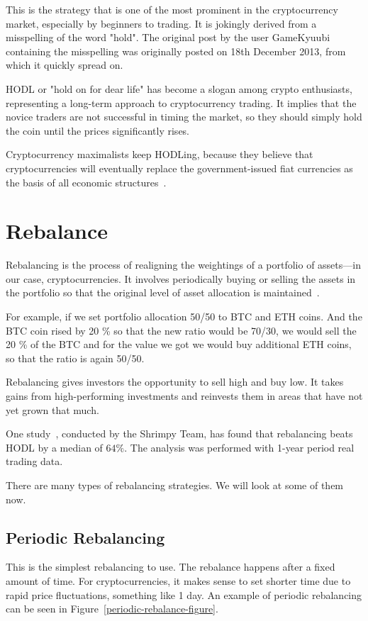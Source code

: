 This is the strategy that is one of the most prominent in the cryptocurrency market, especially by beginners to trading.
It is jokingly derived from a misspelling of the word "hold". The original post by the user GameKyuubi~\cite{hodl-post} containing the misspelling was originally posted on 18th December 2013, from which it quickly spread on.

HODL or "hold on for dear life" has become a slogan among crypto enthusiasts, representing a long-term approach to cryptocurrency trading. It implies that the novice traders are not successful in timing the market, so they should simply hold the coin until the prices significantly rises.

Cryptocurrency maximalists keep HODLing, because they believe that cryptocurrencies will eventually replace the government-issued fiat currencies as the basis of all economic structures~\cite{investopedia-hodl}.

\section{Rebalance}
\label{section-rebalance}
Rebalancing is the process of realigning the weightings of a portfolio of assets---in our case, cryptocurrencies. It involves periodically buying or selling the assets in the portfolio so that the original level of asset allocation is maintained~\cite{investopedia-rebalancing}.

For example, if we set portfolio allocation 50/50 to BTC and ETH coins. And the BTC coin rised by 20 \% so that the new ratio would be 70/30, we would sell the 20 \% of the BTC and for the value we got we would buy additional ETH coins, so that the ratio is again 50/50.

Rebalancing gives investors the opportunity to sell high and buy low. It takes gains from high-performing investments and reinvests them in areas that have not yet grown that much.

One study~\cite{portfolio-rebalancing}, conducted by the Shrimpy Team, has found that rebalancing beats HODL by a median of $64\%$. The analysis was performed with 1-year period real trading data.

There are many types of rebalancing strategies. We will look at some of them now.

\subsection*{Periodic Rebalancing}
This is the simplest rebalancing to use. The rebalance happens after a fixed amount of time. For cryptocurrencies, it makes sense to set shorter time due to rapid price fluctuations, something like 1 day. An example of periodic rebalancing can be seen in Figure~\ref{periodic-rebalance-figure}.


